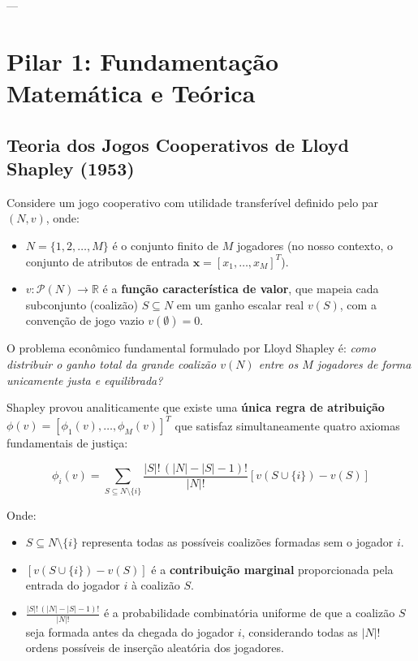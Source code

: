 \documentclass[11pt,a4paper]{article}
\begin{document}
---

\section{Pilar 1: Fundamentação Matemática e Teórica}

\subsection{Teoria dos Jogos Cooperativos de Lloyd Shapley (1953)}

Considere um jogo cooperativo com utilidade transferível definido pelo par $(N, v)$, onde:
\begin{itemize}[leftmargin=*]
  \item $N = \{1, 2, \dots, M\}$ é o conjunto finito de $M$ jogadores (no nosso contexto, o conjunto de atributos de entrada $\mathbf{x} = [x_1, \dots, x_M]^T$).
  \item $v: \mathcal{P}(N) \to \mathbb{R}$ é a \textbf{função característica de valor}, que mapeia cada subconjunto (coalizão) $S \subseteq N$ em um ganho escalar real $v(S)$, com a convenção de jogo vazio $v(\emptyset) = 0$.
\end{itemize}

O problema econômico fundamental formulado por Lloyd Shapley é: \textit{como distribuir o ganho total da grande coalizão $v(N)$ entre os $M$ jogadores de forma unicamente justa e equilibrada?}

Shapley provou analiticamente que existe uma \textbf{única regra de atribuição} $\phi(v) = [\phi_1(v), \dots, \phi_M(v)]^T$ que satisfaz simultaneamente quatro axiomas fundamentais de justiça:

\begin{mathcard}
$$\phi_i(v) = \sum_{S \subseteq N \setminus \{i\}} \frac{|S|! \, (|N| - |S| - 1)!}{|N|!} \left[ v(S \cup \{i\}) - v(S) \right]$$
\end{mathcard}

Onde:
\begin{itemize}[leftmargin=*]
  \item $S \subseteq N \setminus \{i\}$ representa todas as possíveis coalizões formadas sem o jogador $i$.
  \item $[v(S \cup \{i\}) - v(S)]$ é a \textbf{contribuição marginal} proporcionada pela entrada do jogador $i$ à coalizão $S$.
  \item $\frac{|S|! \, (|N| - |S| - 1)!}{|N|!}$ é a probabilidade combinatória uniforme de que a coalizão $S$ seja formada antes da chegada do jogador $i$, considerando todas as $|N|!$ ordens possíveis de inserção aleatória dos jogadores.
\end{itemize}
\end{document}
